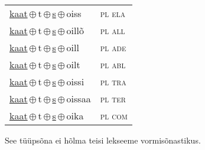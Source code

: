 \begin{minipage}{\textwidth}
\begin{sideways}
\begin{tabular}{l l}
\underline{kaat}\,$\oplus$\,t\,$\oplus$\,\underline{s}\,$\oplus$\,oiss & \textsc{ pl ela } \\
\underline{kaat}\,$\oplus$\,t\,$\oplus$\,\underline{s}\,$\oplus$\,oillõ & \textsc{ pl all } \\
\underline{kaat}\,$\oplus$\,t\,$\oplus$\,\underline{s}\,$\oplus$\,oill & \textsc{ pl ade } \\
\underline{kaat}\,$\oplus$\,t\,$\oplus$\,\underline{s}\,$\oplus$\,oilt & \textsc{ pl abl } \\
\underline{kaat}\,$\oplus$\,t\,$\oplus$\,\underline{s}\,$\oplus$\,oissi & \textsc{ pl tra } \\
\underline{kaat}\,$\oplus$\,t\,$\oplus$\,\underline{s}\,$\oplus$\,oissaa & \textsc{ pl ter } \\
\underline{kaat}\,$\oplus$\,t\,$\oplus$\,\underline{s}\,$\oplus$\,oika & \textsc{ pl com } \\
\end{tabular}
\end{sideways}
\label{tab:tüüpsõnamall-kaatsõd}

\end{minipage}

 
\vspace{1em}
\noindent See tüüpsõna ei hõlma teisi lekseeme vormi\-sõnastikus.
